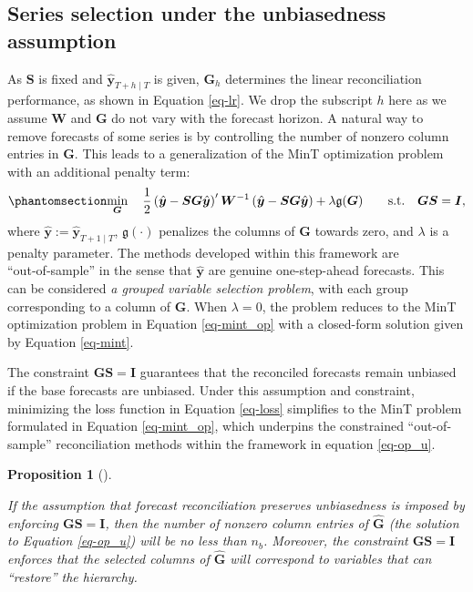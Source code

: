 \documentclass[
  11pt]{article}
\theoremstyle{plain}
\newtheorem{proposition}{Proposition}[section]
\theoremstyle{remark}
\begin{document}
\subsection{Series selection under the unbiasedness
assumption}\label{sec-constrained}

As \(\bm{S}\) is fixed and \(\hat{\bm{y}}_{T+h \mid T}\) is given,
\(\bm{G}_h\) determines the linear reconciliation performance, as shown
in Equation \eqref{eq-lr}. We drop the subscript \(h\) here as we assume
\(\bm{W}\) and \(\bm{G}\) do not vary with the forecast horizon. A
natural way to remove forecasts of some series is by controlling the
number of nonzero column entries in \(\bm{G}\). This leads to a
generalization of the MinT optimization problem with an additional
penalty term: \begin{equation}\phantomsection\label{eq-op_u}{
\min_{\bm{G}} \quad \frac{1}{2}\left(\hat{\bm{y}}-\bm{SG}\hat{\bm{y}}\right)^{\prime} \bm{W}^{-1}\left(\hat{\bm{y}}-\bm{SG}\hat{\bm{y}}\right)
+ \lambda\mathfrak{g}(\bm{G}) \qquad \text{s.t.} \quad \bm{G}\bm{S}=\bm{I},
}\end{equation} where \(\hat{\bm{y}}:=\hat{\bm{y}}_{T+1 \mid T}\),
\(\mathfrak{g}(\cdot)\) penalizes the columns of \(\bm{G}\) towards
zero, and \(\lambda\) is a penalty parameter. The methods developed
within this framework are ``out‑of‑sample'' in the sense that
\(\hat{\bm{y}}\) are genuine one-step-ahead forecasts. This can be
considered \emph{a grouped variable selection problem}, with each group
corresponding to a column of \(\bm{G}\). When \(\lambda = 0\), the
problem reduces to the MinT optimization problem in Equation
\eqref{eq-mint_op} with a closed-form solution given by Equation
\eqref{eq-mint}.

The constraint \(\bm{G}\bm{S}=\bm{I}\) guarantees that the reconciled
forecasts remain unbiased if the base forecasts are unbiased. Under this
assumption and constraint, minimizing the loss function in Equation
\eqref{eq-loss} simplifies to the MinT problem formulated in Equation
\eqref{eq-mint_op}, which underpins the constrained ``out-of-sample''
reconciliation methods within the framework in equation \eqref{eq-op_u}.

\begin{proposition}[]\protect\hypertarget{prp-1}{}\label{prp-1}

If the assumption that forecast reconciliation preserves unbiasedness is
imposed by enforcing \(\bm{GS}=\bm{I}\), then the number of nonzero
column entries of \(\hat{\bm{G}}\) (the solution to Equation
\eqref{eq-op_u}) will be no less than \(n_b\). Moreover, the constraint
\(\bm{GS}=\bm{I}\) enforces that the selected columns of
\(\hat{\bm{G}}\) will correspond to variables that can ``restore'' the
hierarchy.

\end{proposition}
\end{document}
